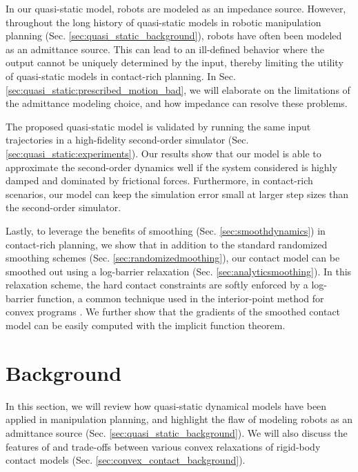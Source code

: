 In our quasi-static model, robots are modeled as an impedance source. However, throughout the long history of quasi-static models in robotic manipulation planning (Sec. \ref{sec:quasi_static_background}), robots have often been modeled as an admittance source. This can lead to an ill-defined behavior where the output cannot be uniquely determined by the input, thereby limiting the utility of quasi-static models in contact-rich planning. In Sec. \ref{sec:quasi_static:prescribed_motion_bad}, we will elaborate on the limitations of the admittance modeling choice, and how impedance can resolve these problems.

The proposed quasi-static model is validated by running the same input trajectories in a high-fidelity second-order simulator (Sec. \ref{sec:quasi_static:experiments}). Our results show that our model is able to approximate the second-order dynamics well if the system considered is highly damped and dominated by frictional forces. Furthermore, in contact-rich scenarios, our model can keep the simulation error small at larger step sizes than the second-order simulator.
 
Lastly, to leverage the benefits of smoothing (Sec. \ref{sec:smoothdynamics}) in contact-rich planning, we show that in addition to the standard randomized smoothing schemes (Sec. \ref{sec:randomizedmoothing}), our contact model can be smoothed out using a log-barrier relaxation (Sec. \ref{sec:analyticsmoothing}). In this relaxation scheme, the hard contact constraints are softly enforced by a log-barrier function, a common technique used in the interior-point method for convex programs \cite[]{boyd2004convex} \cite{howell2022dojo}.
We further show that the gradients of the smoothed contact model can be easily computed with the implicit function theorem.


\section{Background} \label{sec:q_dynamics:background}
In this section, we will review how quasi-static dynamical models have been applied in manipulation planning, and highlight the flaw of modeling robots as an admittance source (Sec. \ref{sec:quasi_static_background}). We will also discuss the features of and trade-offs between various convex relaxations of rigid-body contact models (Sec. \ref{sec:convex_contact_background}).


